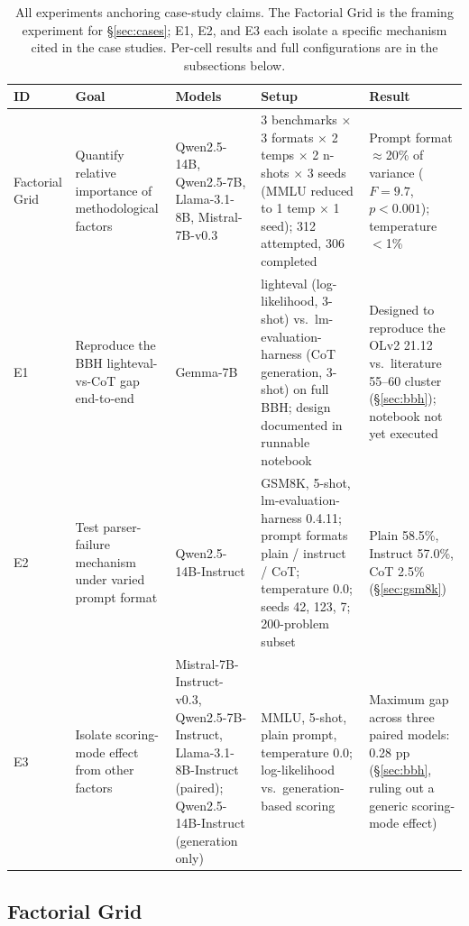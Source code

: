 \documentclass[11pt]{article}
\begin{document}
\begin{table}[ht]
\centering
\small
\setlength{\tabcolsep}{4pt}
\begin{tabular}{lp{3.6cm}p{3.0cm}p{4.4cm}p{4.0cm}}
\toprule
\textbf{ID} & \textbf{Goal} & \textbf{Models} & \textbf{Setup} & \textbf{Result} \\
\midrule
Factorial Grid &
Quantify relative importance of methodological factors &
Qwen2.5-14B, Qwen2.5-7B, Llama-3.1-8B, Mistral-7B-v0.3 &
3 benchmarks $\times$ 3 formats $\times$ 2 temps $\times$ 2 n-shots $\times$ 3 seeds (MMLU reduced to 1 temp $\times$ 1 seed); 312 attempted, 306 completed &
Prompt format $\approx$20\% of variance ($F{=}9.7$, $p{<}0.001$); temperature $<$1\% \\
\midrule
E1 &
Reproduce the BBH lighteval-vs-CoT gap end-to-end &
Gemma-7B &
lighteval (log-likelihood, 3-shot) vs.\ lm-evaluation-harness (CoT generation, 3-shot) on full BBH; design documented in runnable notebook &
Designed to reproduce the OLv2 21.12 vs.\ literature 55--60 cluster (\S\ref{sec:bbh}); notebook not yet executed \\
\midrule
E2 &
Test parser-failure mechanism under varied prompt format &
Qwen2.5-14B-Instruct &
GSM8K, 5-shot, lm-evaluation-harness 0.4.11; prompt formats plain / instruct / CoT; temperature 0.0; seeds 42, 123, 7; 200-problem subset &
Plain 58.5\%, Instruct 57.0\%, CoT 2.5\% (\S\ref{sec:gsm8k}) \\
\midrule
E3 &
Isolate scoring-mode effect from other factors &
Mistral-7B-Instruct-v0.3, Qwen2.5-7B-Instruct, Llama-3.1-8B-Instruct (paired); Qwen2.5-14B-Instruct (generation only) &
MMLU, 5-shot, plain prompt, temperature 0.0; log-likelihood vs.\ generation-based scoring &
Maximum gap across three paired models: 0.28 pp (\S\ref{sec:bbh}, ruling out a generic scoring-mode effect) \\
\bottomrule
\end{tabular}
\caption{All experiments anchoring case-study claims. The Factorial Grid
is the framing experiment for \S\ref{sec:cases}; E1, E2, and E3 each
isolate a specific mechanism cited in the case studies. Per-cell results
and full configurations are in the subsections below.}
\label{tab:experiments-master}
\end{table}


\subsection{Factorial Grid}
\label{app:exp-grid}
\end{document}
